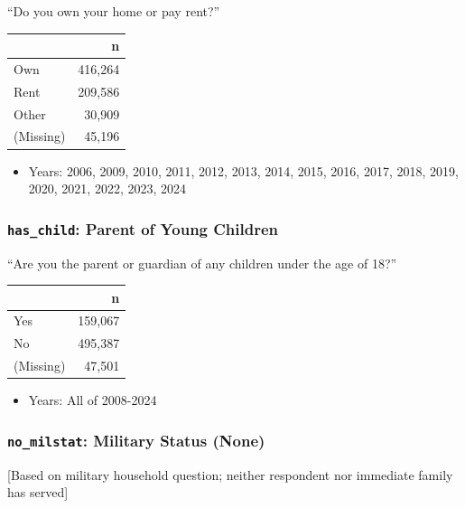\documentclass[10pt,article,oneside]{memoir}
\begin{document}
``Do you own your home or pay rent?''

\begin{table}[H]
\centering
\begin{tabular}[t]{lr}
\toprule
 & n\\
\midrule
Own & 416,264\\
Rent & 209,586\\
Other & 30,909\\
(Missing) & 45,196\\
\bottomrule
\end{tabular}
\end{table}

\begin{itemize}
\tightlist
\item
  Years: 2006, 2009, 2010, 2011, 2012, 2013, 2014, 2015, 2016, 2017,
  2018, 2019, 2020, 2021, 2022, 2023, 2024
\end{itemize}

\subsubsection{\texorpdfstring{\texttt{has\_child}: Parent of Young
Children}{has\_child: Parent of Young Children}}\label{has_child-parent-of-young-children}

``Are you the parent or guardian of any children under the age of 18?''

\begin{table}[H]
\centering
\begin{tabular}[t]{lr}
\toprule
 & n\\
\midrule
Yes & 159,067\\
No & 495,387\\
(Missing) & 47,501\\
\bottomrule
\end{tabular}
\end{table}

\begin{itemize}
\tightlist
\item
  Years: All of 2008-2024
\end{itemize}

\subsubsection{\texorpdfstring{\texttt{no\_milstat}: Military Status
(None)}{no\_milstat: Military Status (None)}}\label{no_milstat-military-status-none}

{[}Based on military household question; neither respondent nor
immediate family has served{]}
\end{document}
